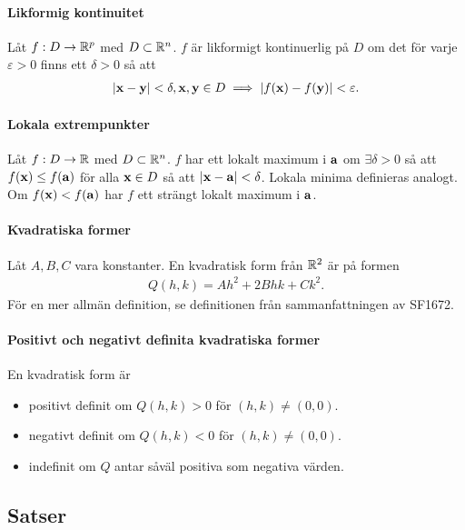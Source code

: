 \paragraph{Likformig kontinuitet}
Låt $f: D\to\mathbb{R}^p$ med $D\subset\mathbb{R}^n$. $f$ är likformigt kontinuerlig på $D$ om det för varje $\varepsilon > 0$ finns ett $\delta > 0$ så att
\begin{align*}
	\abs{\vect{x} - \vect{y}} < \delta, \vect{x}, \vect{y}\in D \implies\abs{f(\vect{x}) - f(\vect{y})} < \varepsilon.
\end{align*}

\paragraph{Lokala extrempunkter}
Låt $f: D\to\mathbb{R}$ med $D\subset\mathbb{R}^n$. $f$ har ett lokalt maximum i $\vect{a}$ om $\exists\delta > 0$ så att $f(\vect{x})\leq f(\vect{a})$ för alla $\vect{x}\in D$ så att $\abs{\vect{x} - \vect{a}} < \delta$. Lokala minima definieras analogt. Om $f(\vect{x}) < f(\vect{a})$ har $f$ ett strängt lokalt maximum i $\vect{a}$.

\paragraph{Kvadratiska former}
Låt $A, B, C$ vara konstanter. En kvadratisk form från $\mathbb{R}^2$ är på formen
\begin{align*}
	Q(h, k) = Ah^2 + 2Bhk + Ck^2.
\end{align*}
För en mer allmän definition, se definitionen från sammanfattningen av SF1672.

\paragraph{Positivt och negativt definita kvadratiska former}
En kvadratisk form är
\begin{itemize}
	\item positivt definit om $Q(h, k) > 0$ för $(h, k)\neq (0,0)$.
	\item negativt definit om $Q(h, k) < 0$ för $(h, k)\neq (0,0)$.
	\item indefinit om $Q$ antar såväl positiva som negativa värden.
\end{itemize}

\subsection{Satser}

